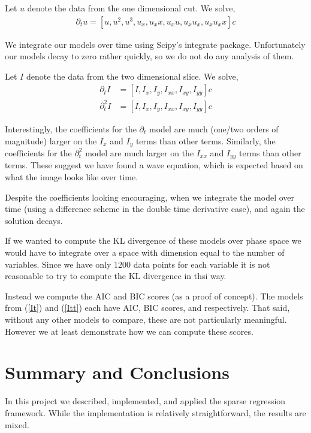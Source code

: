 \documentclass[10pt]{article}
\begin{document}
Let \( u \) denote the data from the one dimensional cut. We solve,
\begin{align*}
    \partial_t u = [u,u^2,u^3,u_x, u_xx, u_xu, u_xu_x, u_xu_xx]c
\end{align*}

We integrate our models over time using Scipy's integrate package. Unfortunately our models decay to zero rather quickly, so we do not do any analysis of them.

Let \( I \) denote the data from the two dimensional slice. We solve,
\begin{align}
    \partial_t I &= [I, I_x, I_y, I_{xx}, I_{xy}, I_{yy}] c \label{It}\\
    \partial_t^2 I &= [I, I_x, I_y, I_{xx}, I_{xy}, I_{yy}] c \label{Itt}
\end{align}

Interestingly, the coefficients for the \( \partial_t \) model are much (one/two orders of magnitude) larger on the \( I_x \) and \( I_y \) terms than other terms. Similarly, the coefficients for the \( \partial_{t}^2 \) model are much larger  on the \( I_{xx} \) and \( I_{yy} \) terms than other terms. These suggest we have found a wave equation, which is expected based on what the image looks like over time.

Despite the coefficients looking encouraging, when we integrate the model over time (using a difference scheme in the double time derivative case), and again the solution decays.

If we wanted to compute the KL divergence of these models over phase space we would have to integrate over a space with dimension equal to the number of variables. Since we have only 1200 data points for each variable it is not reasonable to try to compute the KL divergence in thsi way.

Instead we compute the AIC and BIC scores (as a proof of concept).
The models from (\ref{It}) and (\ref{Itt}) each have AIC, BIC scores, and respectively. That said, without any other models to compare, these are not particularly meaningful. However we at least demonstrate how we can compute these scores.

\section{Summary and Conclusions}
In this project we described, implemented, and applied the sparse regression framework. While the implementation is relatively straightforward, the results are mixed.
\end{document}
